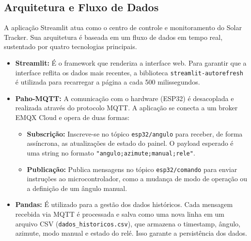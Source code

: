 \documentclass{article}
\begin{document}
\subsection{Arquitetura e Fluxo de Dados}
A aplicação Streamlit atua como o centro de controle e monitoramento do Solar Tracker. Sua arquitetura é baseada em um fluxo de dados em tempo real, sustentado por quatro tecnologias principais.

\begin{itemize}
    \item \textbf{Streamlit:} É o framework que renderiza a interface web. Para garantir que a interface reflita os dados mais recentes, a biblioteca \texttt{streamlit-autorefresh} é utilizada para recarregar a página a cada 500 milissegundos.
    \item \textbf{Paho-MQTT:} A comunicação com o hardware (ESP32) é desacoplada e realizada através do protocolo MQTT. A aplicação se conecta a um broker EMQX Cloud e opera de duas formas:
    \begin{itemize}
        \item \textbf{Subscrição:} Inscreve-se no tópico \texttt{esp32/angulo} para receber, de forma assíncrona, as atualizações de estado do painel. O payload esperado é uma string no formato \texttt{"angulo;azimute;manual;rele"}.
        \item \textbf{Publicação:} Publica mensagens no tópico \texttt{esp32/comando} para enviar instruções ao microcontrolador, como a mudança de modo de operação ou a definição de um ângulo manual.
    \end{itemize}
    \item \textbf{Pandas:} É utilizado para a gestão dos dados históricos. Cada mensagem recebida via MQTT é processada e salva como uma nova linha em um arquivo CSV (\texttt{dados\_historicos.csv}), que armazena o timestamp, ângulo, azimute, modo manual e estado do relé. Isso garante a persistência dos dados.
\end{itemize}
\end{document}
